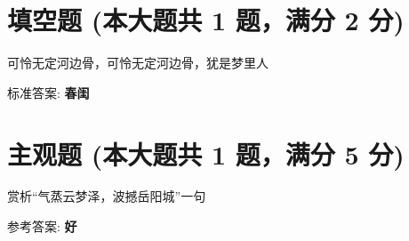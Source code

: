 \documentclass[12pt, a4paper, addpoints]{exam}
\begin{document}
\hspace{5cm}

\section{\normalsize{填空题 (本大题共 1 题，满分 2 分)}}
\hspace{1.5cm}
\begin{questions}
\question[2] 可怜无定河边骨，可怜无定河边骨，犹是\uline{\qquad\qquad\qquad\qquad}梦里人

标准答案: \textbf{春闺}

\end{questions}

\hspace{5cm}

\section{\normalsize{主观题 (本大题共 1 题，满分 5 分)}}
\hspace{1.5cm}
\begin{questions}
\question[5] 赏析“气蒸云梦泽，波撼岳阳城”一句


参考答案: \textbf{好}

\end{questions}
\end{document}
